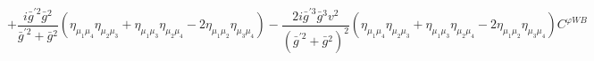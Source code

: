 %
\begin{dmath*}
%
  +  \frac{i {\bar g}^{\prime 2} {\bar g}{}^2}{{\bar g}^{\prime 2} + {\bar g}{}^2} \left(\eta_{\mu_1 \mu_4} \eta_{\mu_2 \mu_3} + \eta_{\mu_1 \mu_3} \eta_{\mu_2 \mu_4} - 2 \eta_{\mu_1 \mu_2} \eta_{\mu_3 \mu_4}\right)  -  \frac{2 i {\bar g}^{\prime 3} {\bar g}{}^3 v^2}{\left({\bar g}^{\prime 2} + {\bar g}{}^2\right)^2}\left(\eta_{\mu_1 \mu_4} \eta_{\mu_2 \mu_3} + \eta_{\mu_1 \mu_3} \eta_{\mu_2 \mu_4} - 2 \eta_{\mu_1 \mu_2} \eta_{\mu_3 \mu_4}\right) C^{ \varphi  WB}
%
\end{dmath*}
%
